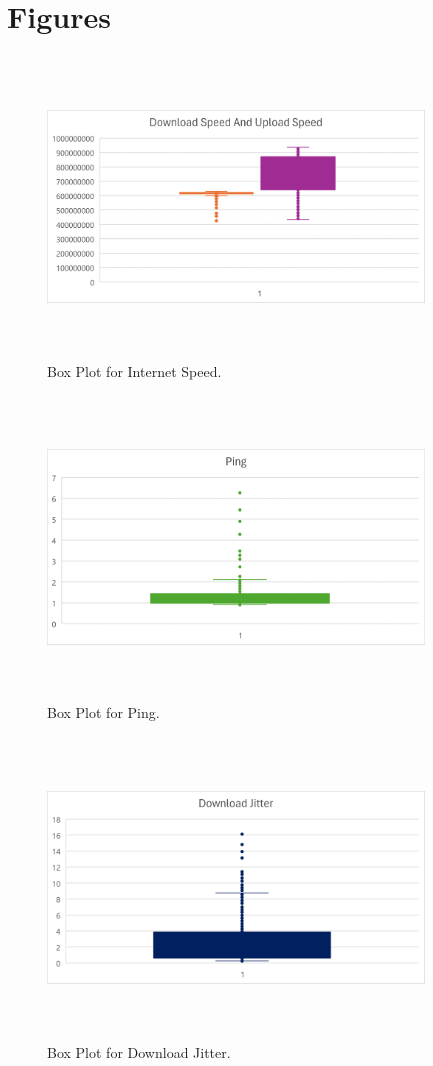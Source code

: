 \documentclass[conference]{IEEEtran}
\begin{document}
\section{Figures}
\begin{figure}[htbp]
    \centerline{\includegraphics[width=10cm,height=8cm,keepaspectratio]{Figures/Picture1.png}}
    \caption{Box Plot for Internet Speed.}
    \label{fig2}
\end{figure}

\begin{figure}[htbp]
    \centerline{\includegraphics[width=10cm,height=8cm,keepaspectratio]{Figures/Picture2.png}}
    \caption{Box Plot for Ping.}
    \label{fig3}
\end{figure}

\begin{figure}[htbp]
    \centerline{\includegraphics[width=10cm,height=8cm,keepaspectratio]{Figures/Picture3.png}}
    \caption{Box Plot for Download Jitter.}
    \label{fig4}
\end{figure}
\end{document}
